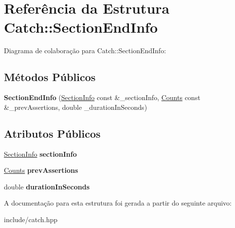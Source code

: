 \hypertarget{structCatch_1_1SectionEndInfo}{}\section{Referência da Estrutura Catch\+:\+:Section\+End\+Info}
\label{structCatch_1_1SectionEndInfo}


Diagrama de colaboração para Catch\+:\+:Section\+End\+Info\+:
\subsection*{Métodos Públicos}
\begin{DoxyCompactItemize}
\item 
{\bfseries Section\+End\+Info} (\hyperlink{structCatch_1_1SectionInfo}{Section\+Info} const \&\+\_\+section\+Info, \hyperlink{structCatch_1_1Counts}{Counts} const \&\+\_\+prev\+Assertions, double \+\_\+duration\+In\+Seconds)\hypertarget{structCatch_1_1SectionEndInfo_abc9381c7c22b6907317ec985ccaa6713}{}\label{structCatch_1_1SectionEndInfo_abc9381c7c22b6907317ec985ccaa6713}

\end{DoxyCompactItemize}
\subsection*{Atributos Públicos}
\begin{DoxyCompactItemize}
\item 
\hyperlink{structCatch_1_1SectionInfo}{Section\+Info} {\bfseries section\+Info}\hypertarget{structCatch_1_1SectionEndInfo_a2d44793392cb83735d086d726822abe9}{}\label{structCatch_1_1SectionEndInfo_a2d44793392cb83735d086d726822abe9}

\item 
\hyperlink{structCatch_1_1Counts}{Counts} {\bfseries prev\+Assertions}\hypertarget{structCatch_1_1SectionEndInfo_ae70b154cbc05b5dd2901d97f89303d8c}{}\label{structCatch_1_1SectionEndInfo_ae70b154cbc05b5dd2901d97f89303d8c}

\item 
double {\bfseries duration\+In\+Seconds}\hypertarget{structCatch_1_1SectionEndInfo_a7c262f2dab9cff166b8eca620c47eea5}{}\label{structCatch_1_1SectionEndInfo_a7c262f2dab9cff166b8eca620c47eea5}

\end{DoxyCompactItemize}


A documentação para esta estrutura foi gerada a partir do seguinte arquivo\+:\begin{DoxyCompactItemize}
\item 
include/catch.\+hpp\end{DoxyCompactItemize}
